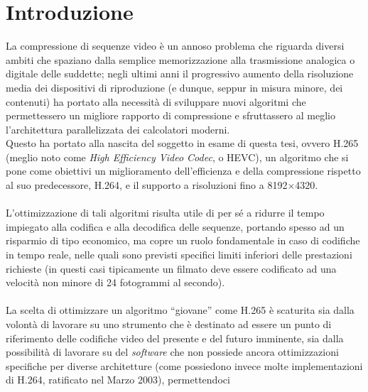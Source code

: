
\chapter{Introduzione} %

\label{Chapter1}



La compressione di sequenze video è un annoso problema che riguarda diversi
ambiti che spaziano dalla semplice memorizzazione alla trasmissione analogica
o digitale delle suddette; negli ultimi anni il progressivo aumento
della risoluzione media dei dispositivi di riproduzione (e dunque, seppur in
misura minore, dei contenuti) ha portato alla necessità di sviluppare nuovi
algoritmi che permettessero un migliore rapporto di compressione e sfruttassero
al meglio l'architettura parallelizzata dei calcolatori moderni. \\
Questo ha portato alla nascita del soggetto in esame di questa tesi, ovvero
H.265 (meglio noto come \emph{High Efficiency Video Codec}, o HEVC), un 
algoritmo che si pone come obiettivi un miglioramento dell'efficienza e
della compressione rispetto al suo predecessore, H.264, e il supporto a
risoluzioni fino a 8192$\times$4320\citep{OverHEVC}. 
\\ \\
L'ottimizzazione di tali algoritmi risulta utile di per sé a ridurre il tempo
impiegato alla codifica e alla decodifica delle sequenze, portando spesso ad
un risparmio di tipo economico, ma copre un ruolo fondamentale in caso di
codifiche in tempo reale, nelle quali sono previsti specifici limiti inferiori
delle prestazioni richieste (in questi casi tipicamente un filmato deve essere 
codificato ad una velocità non minore di 24 fotogrammi al secondo). 
\\ \\
La scelta di ottimizzare un algoritmo ``giovane'' come H.265 è scaturita sia
dalla volontà di lavorare su uno strumento che è destinato ad essere un punto
di riferimento delle codifiche video del presente e del futuro imminente, sia
dalla possibilità di lavorare su del \emph{software} che non possiede ancora
ottimizzazioni specifiche per diverse architetture (come possiedono invece
molte implementazioni di H.264, ratificato nel Marzo 2003), permettendoci
